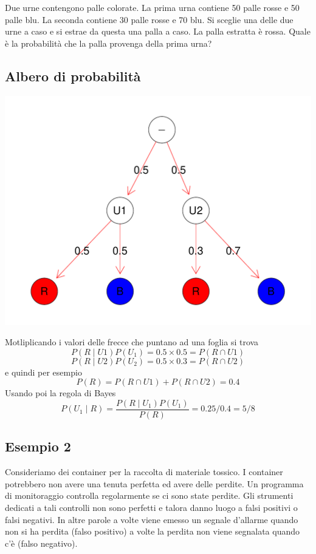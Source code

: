 \documentclass[onecolumn,12pt]{book}\usepackage[]{graphicx}\usepackage[]{color}
\makeatletter
\def\maxwidth{ %
  \ifdim\Gin@nat@width>\linewidth
    \linewidth
  \else
    \Gin@nat@width
  \fi
}
\newenvironment{knitrout}{}{} %
\makeatother
\begin{document}
Due urne contengono palle colorate. La prima urna contiene  50
palle rosse e 50 palle blu. La seconda contiene 30 palle rosse e 70 blu. Si sceglie una delle due urne a caso e si estrae da questa una palla a caso.  
La palla   estratta  è rossa. 
Quale è la probabilità che la palla provenga della prima urna?



\subsection{Albero di probabilità}

\begin{knitrout}
\color{fgcolor}
\includegraphics[width=\maxwidth]{figure/unnamed-chunk-19-1} 

\end{knitrout}

Motliplicando i valori delle frecce che puntano ad una foglia si trova
$$P(R\mid U1)P(U_1)=0.5\times 0.5=P(R\cap U1)$$
$$P(R\mid U2)P(U_2)=0.5\times 0.3=P(R\cap U2)$$
e quindi per esempio
$$P(R)=P(R\cap U1)+P(R\cap U2)=0.4$$
Usando poi la regola di Bayes
$$P(U_1\mid R)=\dfrac{P(R\mid U_1)P(U_1)}{P(R)}=0.25/0.4=5/8$$


\subsection{Esempio 2}

Consideriamo dei container per la raccolta di materiale tossico. I container potrebbero non avere una tenuta perfetta ed avere delle perdite. Un programma di monitoraggio  controlla regolarmente se ci sono state perdite. Gli strumenti dedicati a tali controlli non sono perfetti e talora danno luogo a falsi positivi o falsi negativi.  In altre parole a volte viene emesso un segnale d'allarme quando non si ha perdita (falso positivo) a volte la perdita non viene segnalata quando c'è (falso negativo).
\end{document}
